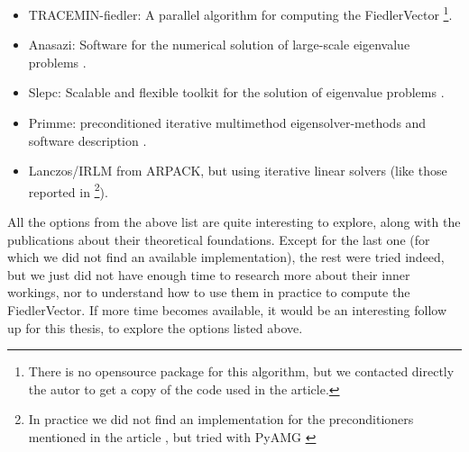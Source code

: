 \newpage
\begin{itemize}
  \item TRACEMIN-fiedler: A parallel algorithm for computing the
    \gls{FiedlerVector} \cite{trminfiedler} \footnote{There is no
      opensource package for this algorithm, but we contacted directly
    the autor to get a copy of the code used in the article.}.
  \item Anasazi: Software for the numerical solution of large-scale
    eigenvalue problems \cite{anasazi}.
  \item Slepc: Scalable and flexible toolkit for the solution of
    eigenvalue problems \cite{slepc}.
  \item Primme: preconditioned iterative multimethod
    eigensolver-methods and software description \cite{primme}.
  \item Lanczos/\gls{IRLM} from ARPACK, but using iterative linear solvers
    (like those reported in \cite{martinez16} \footnote{In practice we
  did not find an implementation for the preconditioners mentioned in
  the article \cite{martinez16}, but tried with PyAMG \cite{pyamg}}). 
\end{itemize}

All the options from the above list are quite interesting to explore, 
along with the publications about their theoretical
foundations. Except for the last one (for which we did not find an
available implementation), the rest were tried indeed, but we just did
not have enough time to research more about their inner workings, nor
to understand how to use them in practice to compute the
\gls{FiedlerVector}. If more time becomes available, it would be an interesting
follow up for this thesis, to explore the options listed above.

